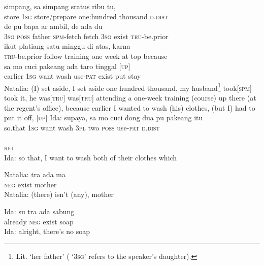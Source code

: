 \ea
{}    {simpang,}    {sa}    {simpang}    {sratus}    {ribu}    {tu,}\\
   {}    {store}    {\textsc{1sg}}    {store/prepare}    {one:hundred}    {thousand}    {\textsc{d.dist}}\\
\gll  de    {pu}    {bapa}    {ar}    {ambil,}    {de}    {ada}    {du}\\
  \textsc{3sg}    {\textsc{poss}}    {father}    {\textsc{spm}{}-fetch}    {fetch}    {\textsc{3sg}}    {exist}    {\textsc{tru}{}-be.prior}\\
    {ikut}    {platiang}    {satu}    {minggu}    {di}    {atas,}    {karna}\\
   {\textsc{tru}{}-be.prior}    {follow}    {training}    {one}    {week}    {at}    {top}    {because}\\
    {sa}    {mo}    {cuci}    {pakeang}    {ada}    {taro}    {tinggal}   {\upshape\textsc{[up]}}\\
   {earlier}    {\textsc{1sg}}    {want}    {wash}    {use-\textsc{pat}}    {exist}    {put}    {stay}   \\
\glt
Natalia: (I) set aside, I set aside one hundred thousand, my husband\footnote{Lit. ‘her father’ ( ‘\textsc{3sg}’ refers to the speaker’s daughter).} took[\textsc{spm}] took it, he was[\textsc{tru}] was[\textsc{tru}] attending a one-week training (course) up there (at the regent’s office), because earlier I wanted to wash (his) clothes, (but I) had to put it off, [\textsc{up}]
\z
\ea
\gll   Ida:   supaya,   sa   mo   cuci   dong   dua   pu   pakeang   itu\\
 {}     so.that   \textsc{1sg}   want   wash   \textsc{3pl}   two   \textsc{poss}   use-\textsc{pat}   \textsc{d.dist}\\
\\
   {\textsc{rel}}\\
\glt
Ida: so that, I want to wash both of their clothes which
\z

\ea
\gll   Natalia:   tra   ada   ma\\
{}     \textsc{neg}   exist   mother\\
\glt
Natalia: (there) isn’t (any), mother
\z

\ea
\gll   Ida:   su   tra   ada   sabung\\
   {}  already   \textsc{neg}   exist   soap\\
\glt
Ida: alright, there’s no soap
\z

